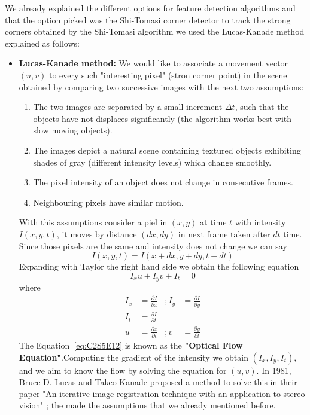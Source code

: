 We already explained the different options for feature detection algorithms and that the option picked was the Shi-Tomasi corner detector to track the strong corners obtained by the Shi-Tomasi algorithm we used the Lucas-Kanade method explained as follows:
\begin{itemize}
\item \textbf{Lucas-Kanade method:} We would like to associate a movement vector $(u,v)$ to every such "interesting pixel" (stron corner point) in the scene obtained by comparing two successive images with the next two assumptions:
\begin{enumerate}
\item The two images are separated by a small increment $\Delta t$, such that the objects have not displaces significantly (the algorithm works best with slow moving objects). 
\item The images depict a natural scene containing textured objects exhibiting shades of gray (different intensity levels) which change smoothly.
\item The pixel intensity of an object does not change in consecutive frames.
\item Neighbouring pixels have similar motion.
\end{enumerate}
With this assumptions consider a piel in $(x,y)$ at time $t$ with intensity $I(x,y,t)$, it moves by distance $(dx,dy)$ in next frame taken after $dt$ time. Since those pixels are the same and intensity does not change we can say 
$$
I(x,y,t)=I(x+dx,y+dy,t+dt)
$$
Expanding with Taylor the right hand side we obtain the following equation
\begin{equation}
\label{eq:C2S5E12}
I_xu+I_yv+I_t=0
\end{equation}
where 
$$
\begin{aligned}
I_x &= \frac{\partial I}{\partial x}&;
I_y &= \frac{\partial I}{\partial y}\\
I_t &= \frac{\partial I}{\partial t}\\
u &= \frac{\partial x}{\partial t}&;
v &= \frac{\partial y}{\partial t}
\end{aligned}
$$
The Equation~\ref{eq:C2S5E12} is known as the \textbf{"Optical Flow Equation"}.Computing the gradient of the intensity we obtain $(I_x,I_y,I_t)$, and we aim to know the flow by solving the equation for $(u,v)$. In 1981, Bruce D. Lucas and Takeo Kanade proposed a method to solve this in their paper "An iterative image registration technique with an application to stereo vision" \cite{LucasKanade}; the made the assumptions that we already mentioned before. 


\end{itemize}
